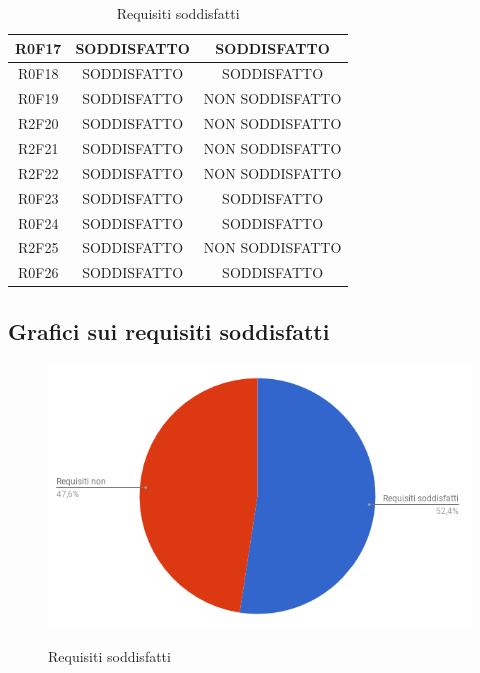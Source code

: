 \begin{table}[hp]
\begin{tabular}{|c|c|c|}
R0F17        & SODDISFATTO                       & SODDISFATTO                \\ \hline
R0F18        & SODDISFATTO                       & SODDISFATTO                \\ \hline
R0F19        & SODDISFATTO                       & NON SODDISFATTO                \\ \hline
R2F20        & SODDISFATTO                       & NON SODDISFATTO                \\ \hline
R2F21        & SODDISFATTO                       & NON SODDISFATTO                \\ \hline
R2F22        & SODDISFATTO                       & NON SODDISFATTO                \\ \hline
R0F23        & SODDISFATTO                       & SODDISFATTO                \\ \hline
R0F24        & SODDISFATTO                       & SODDISFATTO                \\ \hline
R2F25        & SODDISFATTO                       & NON SODDISFATTO                \\ \hline
R0F26        & SODDISFATTO                       & SODDISFATTO                \\ 
\hline
\end{tabular}
\caption{Requisiti soddisfatti}
\end{table}
\clearpage

\subsection{Grafici sui requisiti soddisfatti}
\begin{figure}[hp]
\centering
\includegraphics[height=7cm]{img/RequisitiSoddisfatti.png}\\
\caption{Requisiti soddisfatti}
\end{figure}

